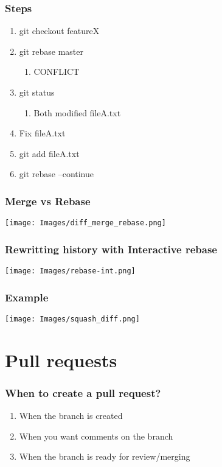 \documentclass{beamer}
\begin{document}
	\begin{frame}[plain]
		\frametitle{Steps}
		
		\begin{enumerate}
			\item git checkout featureX
			\item git rebase master
				\begin{enumerate}
					\item CONFLICT
				\end{enumerate}
			\item git status
				\begin{enumerate}
					\item Both modified fileA.txt
				\end{enumerate}
			\item Fix fileA.txt
			\item git add fileA.txt
			\item git rebase --continue
		\end{enumerate}
		
	
	\end{frame}

	\begin{frame}[plain]
		\frametitle{Merge vs Rebase}
	
		\begin{center}
			\texttt{[image: Images/diff\_merge\_rebase.png]}
		\end{center}
	
	\end{frame}


	\begin{frame}[plain]
		\frametitle{Rewritting history with Interactive rebase}
	
		\begin{center}
			\texttt{[image: Images/rebase-int.png]}
		\end{center}
	
	\end{frame}

	\begin{frame}[plain]
		\frametitle{Example}
	
		\begin{center}
			\texttt{[image: Images/squash\_diff.png]}
		\end{center}
	
	\end{frame}


	\section{Pull requests}
	\begin{frame}[plain]
		\frametitle{When to create a pull request?}
		\begin{enumerate}
			\item When the branch is created
			\item When you want comments on the branch
			\item When the branch is ready for review/merging
		\end{enumerate}
	\end{frame}
\end{document}
